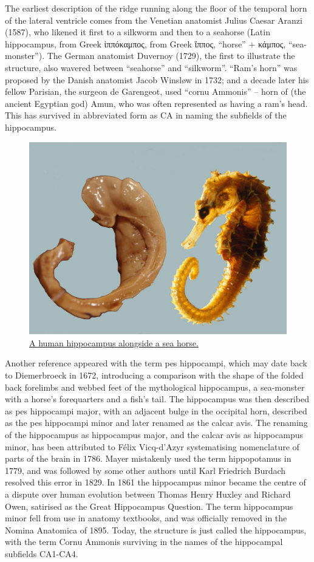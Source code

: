 The earliest description of the ridge running along the floor of the temporal horn of the lateral ventricle comes from the Venetian anatomist Julius Caesar Aranzi (1587), who likened it first to a silkworm and then to a seahorse (Latin hippocampus, from Greek ἱππόκαμπος, from Greek ἵππος, ``horse'' + κάμπος, ``sea-monster''). The German anatomist Duvernoy (1729), the first to illustrate the structure, also wavered between ``seahorse'' and ``silkworm''. ``Ram's horn'' was proposed by the Danish anatomist Jacob Winsløw in 1732; and a decade later his fellow Parisian, the surgeon de Garengeot, used ``cornu Ammonis'' -- horn of (the ancient Egyptian god) Amun, who was often represented as having a ram's head. This has survived in abbreviated form as CA in naming the subfields of the hippocampus.



\begin{figure}

{\centering \includegraphics[width=0.7\linewidth]{./figures/cns/Hippocampus_and_seahorse} 

}

\caption{\href{https://commons.wikimedia.org/wiki/File:Hippocampus_and_seahorse.JPG}{A human hippocampus alongside a sea horse.}}\label{fig:seahorse}
\end{figure}

Another reference appeared with the term pes hippocampi, which may date back to Diemerbroeck in 1672, introducing a comparison with the shape of the folded back forelimbs and webbed feet of the mythological hippocampus, a sea-monster with a horse's forequarters and a fish's tail. The hippocampus was then described as pes hippocampi major, with an adjacent bulge in the occipital horn, described as the pes hippocampi minor and later renamed as the calcar avis. The renaming of the hippocampus as hippocampus major, and the calcar avis as hippocampus minor, has been attributed to Félix Vicq-d'Azyr systematising nomenclature of parts of the brain in 1786. Mayer mistakenly used the term hippopotamus in 1779, and was followed by some other authors until Karl Friedrich Burdach resolved this error in 1829. In 1861 the hippocampus minor became the centre of a dispute over human evolution between Thomas Henry Huxley and Richard Owen, satirised as the Great Hippocampus Question. The term hippocampus minor fell from use in anatomy textbooks, and was officially removed in the Nomina Anatomica of 1895. Today, the structure is just called the hippocampus, with the term Cornu Ammonis surviving in the names of the hippocampal subfields CA1-CA4.

